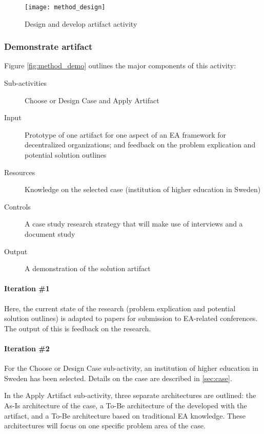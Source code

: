 \begin{figure}
\texttt{[image: method\_design]}
\caption{Design and develop artifact activity}
\label{fig:method_design}
\end{figure}
  
\subsubsection*{Demonstrate artifact}

Figure \ref{fig:method_demo} outlines the major components of this activity:
\begin{description}
  \item[Sub-activities]  Choose or Design Case and Apply Artifact~\cite[Ch. 8]{johannessonPerjons2012}
  \item[Input] Prototype of one artifact for one aspect of an EA framework for decentralized organizations; and feedback on the problem explication and potential solution outlines
  \item[Resources]  Knowledge on the selected case (institution of higher education in Sweden)
  \item[Controls]  A case study research strategy that will make use of interviews and a document study
  \item[Output] A demonstration of the solution artifact
\end{description}

\paragraph{Iteration \#1}

Here, the current state of the research (problem explication and potential solution outlines) is adapted to papers for submission to EA-related conferences. The output of this is feedback on the research.

\paragraph{Iteration \#2}
For the Choose or Design Case sub-activity, an institution of higher education in Sweden has been selected. Details on the case are described in \ref{sec:case}.

In the Apply Artifact sub-activity, three separate architectures are outlined: the As-Is architecture of the case, a To-Be architecture of the developed with the artifact, and a To-Be architecture based on traditional EA knowledge. These architectures will focus on one specific problem area of the case.


